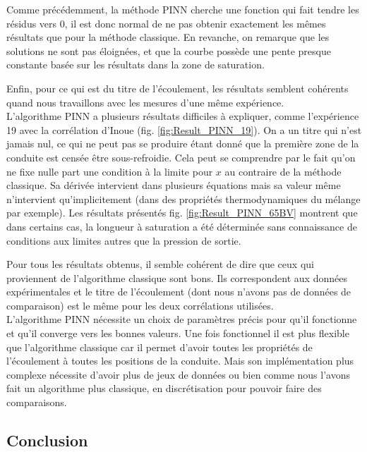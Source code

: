 Comme précédemment, la méthode PINN cherche une fonction qui fait tendre les résidus vers 0, il est donc normal de ne pas obtenir exactement les mêmes résultats que pour la méthode classique. En revanche, on remarque que les solutions ne sont pas éloignées, et que la courbe possède une pente presque constante basée sur les résultats dans la zone de saturation.\\ \par
Enfin, pour ce qui est du titre de l'écoulement, les résultats semblent cohérents quand nous travaillons avec les mesures d'une même expérience. \\

L'algorithme PINN a plusieurs résultats difficiles à expliquer, comme l'expérience 19 avec la corrélation d'Inoue (fig. \ref{fig:Result_PINN_19}). On a un titre qui n'est jamais nul, ce qui ne peut pas se produire étant donné que la première zone de la conduite est censée être sous-refroidie. Cela peut se comprendre par le fait qu'on ne fixe nulle part  une condition à la limite pour $x$ au contraire de la méthode classique. Sa dérivée intervient dans plusieurs équations mais sa valeur même n'intervient qu'implicitement (dans des propriétés thermodynamiques du mélange par exemple). Les résultats présentés fig. \ref{fig:Result_PINN_65BV} montrent que dans certains cas, la longueur à saturation a été déterminée sans connaissance de conditions aux limites autres que la pression de sortie.\\ \par

Pour tous les résultats obtenus, il semble cohérent de dire que ceux qui proviennent de l'algorithme classique sont bons. Ils correspondent aux données expérimentales et le titre de l'écoulement (dont nous n'avons pas de données de comparaison) est le même pour les deux corrélations utilisées.\\

L'algorithme PINN nécessite un choix de paramètres précis pour qu'il fonctionne et qu'il converge vers les bonnes valeurs. Une fois fonctionnel il est plus flexible que l'algorithme classique car il permet d'avoir toutes les propriétés de l'écoulement à toutes les positions de la conduite. Mais son implémentation plus complexe nécessite d'avoir plus de jeux de données ou bien comme nous l'avons fait un algorithme plus classique, en discrétisation pour pouvoir faire des comparaisons.

\subsection{Conclusion}

